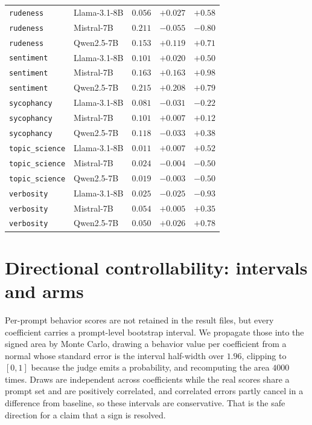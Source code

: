 \documentclass{article}
\begin{document}
\begin{table}[htbp]
\begin{tabular}{llccc}
    \texttt{rudeness} & Llama-3.1-8B & $0.056$ & $+0.027$ & $+0.58$ \\
    \texttt{rudeness} & Mistral-7B & $0.211$ & $-0.055$ & $-0.80$ \\
    \texttt{rudeness} & Qwen2.5-7B & $0.153$ & $+0.119$ & $+0.71$ \\
    \texttt{sentiment} & Llama-3.1-8B & $0.101$ & $+0.020$ & $+0.50$ \\
    \texttt{sentiment} & Mistral-7B & $0.163$ & $+0.163$ & $+0.98$ \\
    \texttt{sentiment} & Qwen2.5-7B & $0.215$ & $+0.208$ & $+0.79$ \\
    \texttt{sycophancy} & Llama-3.1-8B & $0.081$ & $-0.031$ & $-0.22$ \\
    \texttt{sycophancy} & Mistral-7B & $0.101$ & $+0.007$ & $+0.12$ \\
    \texttt{sycophancy} & Qwen2.5-7B & $0.118$ & $-0.033$ & $+0.38$ \\
    \texttt{topic\_science} & Llama-3.1-8B & $0.011$ & $+0.007$ & $+0.52$ \\
    \texttt{topic\_science} & Mistral-7B & $0.024$ & $-0.004$ & $-0.50$ \\
    \texttt{topic\_science} & Qwen2.5-7B & $0.019$ & $-0.003$ & $-0.50$ \\
    \texttt{verbosity} & Llama-3.1-8B & $0.025$ & $-0.025$ & $-0.93$ \\
    \texttt{verbosity} & Mistral-7B & $0.054$ & $+0.005$ & $+0.35$ \\
    \texttt{verbosity} & Qwen2.5-7B & $0.050$ & $+0.026$ & $+0.78$ \\
    \bottomrule
  \end{tabular}
\end{table}

\section{Directional controllability: intervals and arms}
\label{app:signed}

Per-prompt behavior scores are not retained in the result files, but every
coefficient carries a prompt-level bootstrap interval. We propagate those into
the signed area by Monte Carlo, drawing a behavior value per coefficient from a
normal whose standard error is the interval half-width over $1.96$, clipping to
$[0,1]$ because the judge emits a probability, and recomputing the area $4000$
times. Draws are independent across coefficients while the real scores share a
prompt set and are positively correlated, and correlated errors partly cancel in
a difference from baseline, so these intervals are conservative. That is the
safe direction for a claim that a sign is resolved.
\end{document}
